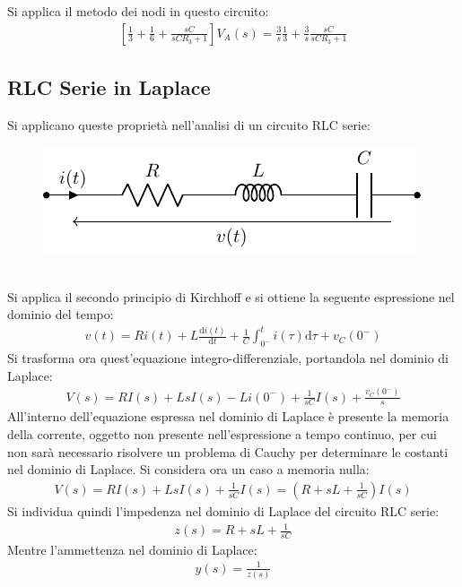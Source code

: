 \documentclass{article}
\newcommand{\df}{\mathrm{d}}
\numberwithin{equation}{subsection}
\begin{document}
Si applica il metodo dei nodi in questo circuito:
\begin{gather*}
    \left[\displaystyle\frac{1}{3}+\frac{1}{6}+\frac{sC}{sC R_3+1}\right]V_A(s)=\frac{3}{s}\frac{1}{3}+\frac{3}{s}\frac{sC}{sCR_3+1}
\end{gather*}

\subsection{RLC Serie in Laplace}

Si applicano queste proprietà nell'analisi di un circuito RLC serie:
\begin{figure}[ht]%
    \centering
    \includegraphics{serie-circuito-rlc-serie.pdf}
    \label{fig:serie-circuito-rlc-serie}
\end{figure}
\\
Si applica il secondo principio di Kirchhoff e si ottiene la seguente espressione nel dominio del tempo:
\begin{gather*}
    v(t)=Ri(t)+L\displaystyle\frac{\df i(t)}{\df t}+\frac{1}{C}\int_{0^-}^ti(\tau)\df\tau+v_C(0^-)
\end{gather*}
Si trasforma ora quest'equazione integro-differenziale, portandola nel dominio di Laplace:
\begin{gather*}
    V(s)=RI(s)+LsI(s)-Li(0^-)+\displaystyle\frac{1}{sC}I(s)+\frac{v_C(0^-)}{s}
\end{gather*}
All'interno dell'equazione espressa nel dominio di Laplace è presente la memoria della corrente, oggetto non presente nell'espressione a tempo continuo, per cui non sarà 
necessario risolvere un problema di Cauchy per determinare le costanti nel dominio di Laplace. Si considera ora un caso a memoria nulla:
\begin{gather*}
    V(s)=RI(s)+LsI(s)+\displaystyle\frac{1}{sC}I(s)=\left(R+sL+\frac{1}{sC}\right)I(s)
\end{gather*}
Si individua quindi l'impedenza nel dominio di Laplace del circuito RLC serie:
\begin{gather*}
    z(s)=R+sL+\displaystyle\frac{1}{sC}
\end{gather*}
Mentre l'ammettenza nel dominio di Laplace:
\begin{gather*}
    y(s)=\displaystyle\frac{1}{z(s)}
\end{gather*} 
\end{document}
